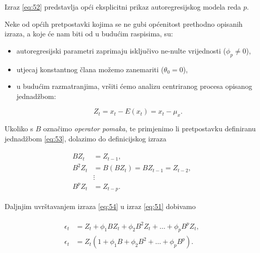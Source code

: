\documentclass[a4paper,12pt,oneside]{memoir}
\begin{document}
            Izraz \ref{eq:52} predstavlja opći eksplicitni prikaz autoregresijskog modela reda $p$.

            Neke od općih pretpostavki kojima se ne gubi općenitost prethodno opisanih izraza, a koje će nam biti od u budućim raspisima, su:

            \begin{itemize}
                \item autoregresijski parametri zaprimaju isključivo ne-nulte vrijednosti ($\phi_p\neq0$),
                \item utjecaj konstantnog člana možemo zanemariti ($\theta_0=0$),
                \item u budućim razmatranjima, vršiti ćemo analizu centriranog procesa opisanog jednadžbom:
                
                \begin{equation}
                    Z_t=x_t-E(x_t)=x_t-\mu_x.
                    \label{eq:53}
                \end{equation}
            \end{itemize}

            Ukoliko s $B$ označimo \textit{operator pomaka}, te primjenimo li pretpostavku definiranu jednadžbom \ref{eq:53}, dolazimo do definicijskog izraza

            \begin{align}
                \begin{split}
                    BZ_t&=Z_{t-1},\\
                    B^2Z_t&=B(BZ_t)=BZ_{t-1}=Z_{t-2},\\
                    &\vdots\\
                    B^pZ_t&=Z_{t-p}.
                \end{split}
                \label{eq:54}
            \end{align}

            Daljnjim uvrštavanjem izraza \ref{eq:54} u izraz \ref{eq:51} dobivamo

            \begin{align}
                \begin{split}
                    \epsilon_t&=Z_t+\phi_1BZ_t+\phi_2B^2Z_t+\ldots+\phi_pB^pZ_t,\\
                    \epsilon_t&=Z_t(1+\phi_1B+\phi_2B^2+\ldots+\phi_pB^p).
                \end{split}
                \label{eq:55}
            \end{align}
\end{document}
